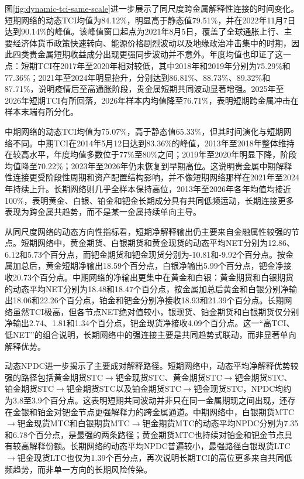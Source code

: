 \documentclass[UTF8,zihao=-4,fontset=fandol]{ctexart}
\begin{document}
图\ref{fig:dynamic-tci-same-scale}进一步展示了同尺度跨金属解释性连接的时间变化。短期网络的动态TCI均值为84.12\%，明显高于静态值79.51\%，并在2022年11月7日达到90.14\%的峰值。该峰值窗口起点为2021年8月5日，覆盖了全球通胀上行、主要经济体货币政策快速转向、能源价格剧烈波动以及地缘政治冲击集中的时期，因此四类贵金属短期收益成分出现更强同步波动并不意外。年度均值也印证了这一点：短期TCI在2017年至2020年相对较低，其中2018年和2019年分别为75.29\%和77.36\%；2021年至2024年明显抬升，分别达到86.81\%、88.73\%、89.32\%和87.71\%，说明疫情后至高通胀阶段，贵金属短期共同波动显著增强。2025年至2026年短期TCI有所回落，2026年样本内均值降至76.71\%，表明短期跨金属冲击在样本末端有所分化。

中期网络的动态TCI均值为75.07\%，高于静态值65.33\%，但其时间演化与短期网络不同。中期TCI在2014年5月12日达到83.36\%的峰值，2013年至2018年整体维持在较高水平，年度均值多数位于77\%至80\%之间；2019年至2020年明显下降，阶段均值降至70.22\%；2023年至2026年仍未恢复到早期高位。这说明贵金属中期解释性连接更受阶段性周期和资产配置结构影响，并不像短期网络那样在2021年至2024年持续上升。长期网络则几乎全样本保持高位，2013年至2026年各年均值均接近100\%，表明黄金、白银、铂金和钯金长期成分具有共同低频运动，长期连接更多表现为跨金属共趋势，而不是某一金属持续单向主导。

从同尺度网络的动态方向性指标看，短期净解释输出仍主要来自金融属性较强的节点。短期网络中，黄金期货、白银期货和黄金现货的动态平均NET分别为12.86、6.12和5.73个百分点，而钯金期货和钯金现货分别为-10.81和-9.92个百分点。按金属加总后，黄金短期净输出18.59个百分点，白银净输出5.99个百分点，钯金净接收20.73个百分点。中期网络的净输出更集中在黄金和白银：黄金期货和白银期货的动态平均NET分别为18.48和18.47个百分点，按金属加总后黄金和白银分别净输出18.06和22.26个百分点，铂金和钯金分别净接收18.93和21.39个百分点。长期网络虽然TCI极高，但各节点NET绝对值较小，银现货、铂金期货和白银期货仅分别净输出2.74、1.81和1.34个百分点，钯金现货净接收4.09个百分点。这一“高TCI、低NET”的组合说明，长期网络中的强连接主要是共同趋势式联动，而非显著单向解释优势。

动态NPDC进一步揭示了主要成对解释路径。短期网络中，动态平均净解释优势较强的路径包括黄金期货STC$\rightarrow$钯金现货STC、黄金期货STC$\rightarrow$钯金期货STC、铂金期货STC$\rightarrow$钯金期货STC以及铂金期货STC$\rightarrow$钯金现货STC，NPDC均约为3.8至3.9个百分点。这表明短期共同波动并非只在同一金属期现之间出现，还存在金银和铂金对钯金节点更强解释力的跨金属通道。中期网络中，白银期货MTC$\rightarrow$钯金现货MTC和白银期货MTC$\rightarrow$钯金期货MTC的动态平均NPDC分别为7.35和6.78个百分点，是最强的两条路径；黄金期货MTC也持续对铂金和钯金节点具有较高解释份额。长期网络的动态平均NPDC普遍较小，最强路径白银现货LTC$\rightarrow$钯金现货LTC也仅为1.39个百分点，再次说明长期TCI的高位更多来自共同低频趋势，而非单一方向的长期风险传染。
\end{document}
